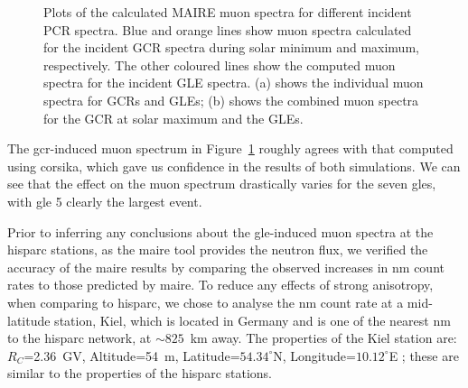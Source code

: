 \begin{figure}[ht!]
	\centering
	\qquad
	\caption{Plots of the calculated MAIRE muon spectra for different incident PCR spectra. Blue and orange lines show muon spectra calculated for the incident GCR spectra during solar minimum and maximum, respectively. The other coloured lines show the computed muon spectra for the incident GLE spectra. (a) shows the individual muon spectra for GCRs and GLEs; (b) shows the combined muon spectra for the GCR at solar maximum and the GLEs.}
	\label{fig:MAIRE_muon_spectra}
\end{figure}


The \gls{gcr}-induced muon spectrum in Figure~\ref{fig:MAIRE_muon_spectra} roughly agrees with that computed using \gls{corsika}, which gave us confidence in the results of both simulations. We can see that the effect on the muon spectrum drastically varies for the seven \glspl{gle}, with \gls{gle} 5 clearly the largest event.

Prior to inferring any conclusions about the \gls{gle}-induced muon spectra at the \gls{hisparc} stations, as the \gls{maire} tool provides the neutron flux, we verified the accuracy of the \gls{maire} results by comparing the observed increases in \gls{nm} count rates to those predicted by \gls{maire}. To reduce any effects of strong anisotropy, when comparing to \gls{hisparc}, we chose to analyse the \gls{nm} count rate at a mid-latitude station, Kiel, which is located in Germany and is one of the nearest \gls{nm} to the \gls{hisparc} network, at $\sim 825$~km away. The properties of the Kiel station are: $R_C$=2.36~GV, Altitude=54~m, Latitude=$54.34^{\circ}$N, Longitude=$10.12^{\circ}$E \citep{nmdb_nmdb_nodate}; these are similar to the properties of the \gls{hisparc} stations.

